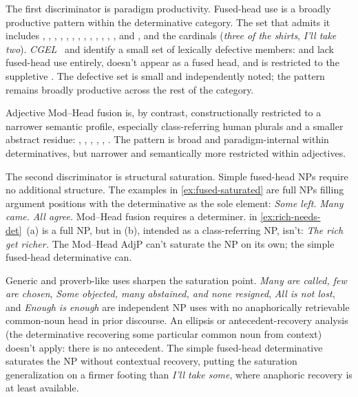 \documentclass[12pt]{article}
\begin{document}
The first discriminator is paradigm productivity. Fused-head use is a broadly productive pattern within the determinative category. The set that admits it includes , , , , , , , , , , , , , and , and the cardinals (\textit{three of the shirts}, \textit{I'll take two}). \textit{CGEL}~\citep[371--2]{huddleston2002} and \textcite[22--23]{Payne2007} identify a small set of lexically defective members:  and  lack fused-head use entirely,  doesn't appear as a fused head, and  is restricted to the suppletive . The defective set is small and independently noted; the pattern remains broadly productive across the rest of the category.

Adjective Mod--Head fusion is, by contrast, constructionally restricted to a narrower semantic profile, especially class-referring human plurals and a smaller abstract residue: , , , , , . The pattern is broad and paradigm-internal within determinatives, but narrower and semantically more restricted within adjectives.

The second discriminator is structural saturation. Simple fused-head NPs require no additional structure. The examples in \ref{ex:fused-saturated} are full NPs filling argument positions with the determinative as the sole element:
\ea\label{ex:fused-saturated}
\ea \textit{Some left.}
\ex \textit{Many came.}
\ex \textit{All agree.}
\z
\z
Mod--Head fusion requires a determiner.  in \ref{ex:rich-needs-det}~(a) is a full NP, but  in (b), intended as a class-referring NP, isn't:
\ea\label{ex:rich-needs-det}
\ea \textit{The rich get richer.}
\ex {}
\z
\z
The Mod--Head AdjP can't saturate the NP on its own; the simple fused-head determinative can.

Generic and proverb-like uses sharpen the saturation point. \textit{Many are called, few are chosen}, \textit{Some objected, many abstained, and none resigned}, \textit{All is not lost}, and \textit{Enough is enough} are independent NP uses with no anaphorically retrievable common-noun head in prior discourse. An ellipsis or antecedent-recovery analysis (the determinative recovering some particular common noun from context) doesn't apply: there is no antecedent. The simple fused-head determinative saturates the NP without contextual recovery, putting the saturation generalization on a firmer footing than \textit{I'll take some}, where anaphoric recovery is at least available.
\end{document}
